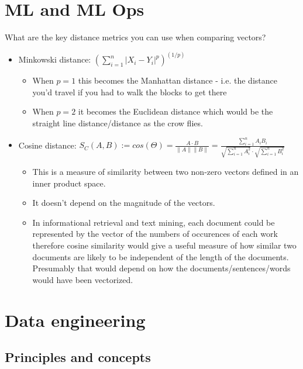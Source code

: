 \section{ML and ML Ops}
\begin{questions}
\question What are the key distance metrics you can use when comparing vectors?
\begin{solution}
\begin{itemize}
    \item Minkowski distance: $( \sum^n_{i=1} |X_i - Y_i |^p )^{(1/p)}$
    \begin{itemize}
        \item When $p=1$ this becomes the Manhattan distance - i.e. the distance you'd travel if you had to walk the blocks to get there
        \item When $p=2$ it becomes the Euclidean distance which would be the straight line distance/distance as the crow flies.
    \end{itemize}
    \item Cosine distance: $S_C(A, B):= cos(\Theta) = \frac{A \cdot B}{\|A\| \|B\| } = \frac{\sum^n_{i=1} A_i B_i}{\sqrt{\sum^n_{i=1}A^{2}_i} \cdot \sqrt{\sum^n_{i=1}B^{2}_i}}$
    \begin{itemize}
        \item This is a measure of similarity between two non-zero vectors defined in an inner product space.
        \item It doesn't depend on the magnitude of the vectors.
        \item In informational retrieval and text mining, each document could be represented by the vector of the numbers of occurences of each work therefore cosine similarity would give a useful measure of how similar two documents are likely to be independent of the length of the documents. Presumably that would depend on how the documents/sentences/words would have been vectorized.
    \end{itemize}
\end{itemize}
\end{solution}
\end{questions}

\section{Data engineering}

\subsection{Principles and concepts}

